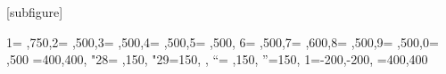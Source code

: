 \usepackage{tocloft}[subfigure] %
\renewcommand{\cfttoctitlefont} %
             {\usefont{T1}{opensans-TLF}{b}{n}\selectfont\huge}
\renewcommand{\cftsecfont} %
             {\usefont{T1}{opensans-TLF}{b}{n}\selectfont}
\renewcommand{\cftsubsecfont} %
             {\usefont{T1}{futs}{b}{n}\selectfont}
\renewcommand{\cftsecpagefont} %
             {\cftsecfont} 
\renewcommand{\cftsubsecpagefont} %
             {\cftsubsecfont}
  
\usepackage[activate={true,nocompatibility},final,tracking=true,kerning=true,spacing=true]{microtype}
                {1={ ,750},2={ ,500},3={ ,500},4={ ,500},5={ ,500},
                6={ ,500},7={ ,600},8={ ,500},9={ ,500},0={ ,500}}
    {\textendash={400,400}, %
     "28={ ,150}, %
     "29={150, }, %
     \textquotedblleft={ ,150}, %
     \textquotedblright={150, }} %
   {1={-200,-200}, 
    \textendash={400,400}}
